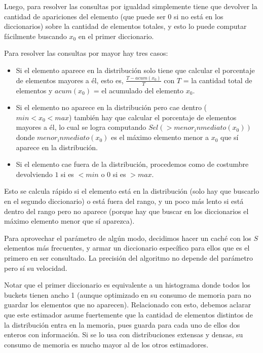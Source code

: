 Luego, para resolver las consultas por igualdad simplemente tiene que devolver la cantidad de apariciones del elemento (que puede ser 0 si no está en los diccionarios) sobre la cantidad de elementos totales, y esto lo puede computar fácilmente buscando $x_0$ en el primer diccionario.

Para resolver las consultas por mayor hay tres casos:
\begin{itemize}
 \item Si el elemento aparece en la distribución solo tiene que calcular el porcentaje de elementos mayores a él, esto es, $\frac{T-acum(x_0)}{T}$ con $T$ = la cantidad total de elementos y $acum(x_0)$ = el acumulado del elemento $x_0$.
 \item Si el elemento no aparece en la distribución pero cae dentro ($min < x_0 < max$) también hay que calcular el porcentaje de elementos mayores a él, lo cual se logra computando $Sel(>menor_inmediato(x_0))$ donde $menor_inmediato(x_0)$ es el máximo elemento menor a $x_0$ que sí aparece en la distribución.
 \item Si el elemento cae fuera de la distribución, procedemos como de costumbre devolviendo $1$ si es $<min$ o $0$ si es $>max$.
\end{itemize}
Esto se calcula rápido si el elemento está en la distribución (solo hay que buscarlo en el segundo diccionario) o está fuera del rango, y un poco más lento si está dentro del rango pero no aparece (porque hay que buscar en los diccionarios el máximo elemento menor que sí aparezca).

Para aprovechar el parámetro de algún modo, decidimos hacer un caché con los $S$ elementos más frecuentes, y armar un diccionario específico para ellos que es el primero en ser consultado. La precisión del algoritmo no depende del parámetro pero sí su velocidad.

Notar que el primer diccionario es equivalente a un histograma donde todos los buckets tienen ancho 1 (aunque optimizado en su consumo de memoria para no guardar los elementos que no aparecen). Relacionado con esto, debemos aclarar que este estimador asume fuertemente que la cantidad de elementos distintos de la distribución entra en la memoria, pues guarda para cada uno de ellos dos enteros con información. Si se lo usa con distribuciones extensas y densas, su consumo de memoria es mucho mayor al de los otros estimadores.